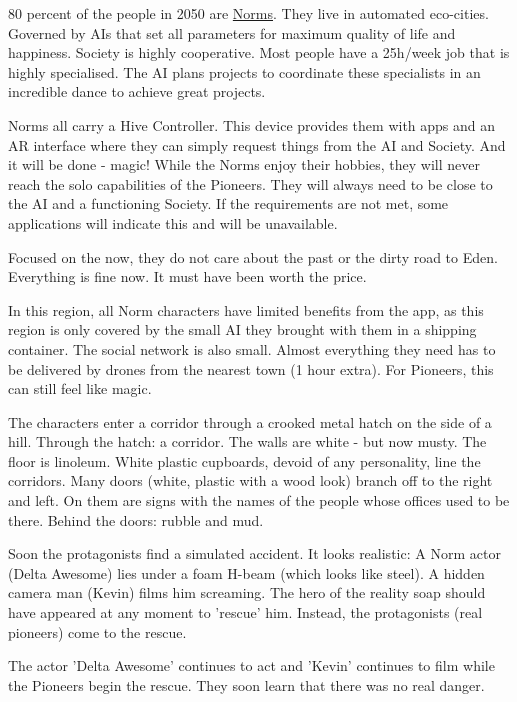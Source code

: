 \begin{sidebarBox}[title=Norms]

80 percent of the people in 2050 are \hyperref[sec:Norms]{Norms}. They live in automated eco-cities. Governed by AIs that set all parameters for maximum quality of life and happiness. Society is highly cooperative. Most people have a 25h/week job that is highly specialised. The AI plans projects to coordinate these specialists in an incredible dance to achieve great projects.

Norms all carry a Hive Controller. This device provides them with apps and an AR interface where they can simply request things from the AI and Society. And it will be done - magic!
While the Norms enjoy their hobbies, they will never reach the solo capabilities of the Pioneers. They will always need to be close to the AI and a functioning Society. If the requirements are not met, some applications will indicate this and will be unavailable.

Focused on the now, they do not care about the past or the dirty road to Eden. Everything is fine now. It must have been worth the price.

In this region, all Norm characters have limited benefits from the app, as this region is only covered by the small AI they brought with them in a shipping container. The social network is also small. Almost everything they need has to be delivered by drones from the nearest town (1 hour extra). For Pioneers, this can still feel like magic.

\end{sidebarBox}

The characters enter a corridor through a crooked metal hatch on the side of a hill. Through the hatch: a corridor. The walls are white - but now musty. The floor is linoleum.
White plastic cupboards, devoid of any personality, line the corridors. Many doors (white, plastic with a wood look) branch off to the right and left. On them are signs with the names of the people whose offices used to be there. Behind the doors: rubble and mud.

Soon the protagonists find a simulated accident. It looks realistic: A Norm actor (Delta Awesome) lies under a foam H-beam (which looks like steel). A hidden camera man (Kevin) films him screaming. The hero of the reality soap should have appeared at any moment to 'rescue' him. Instead, the protagonists (real pioneers) come to the rescue.

The actor 'Delta Awesome' continues to act and 'Kevin' continues to film while the Pioneers begin the rescue. They soon learn that there was no real danger.

